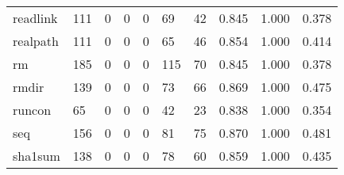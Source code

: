 \begin{longtable}{lp{1.3cm}p{1.3cm}p{1.3cm}p{1.3cm}p{1.3cm}p{1.3cm}p{1.3cm}p{1.3cm}p{1.3cm}}
readlink  &                    111 &                                             0 &                                            0 &                                           0 &                                           69 &                                         42 &                                0.845 &                                  1.000 &                                0.378 \\
realpath  &                    111 &                                             0 &                                            0 &                                           0 &                                           65 &                                         46 &                                0.854 &                                  1.000 &                                0.414 \\
rm        &                    185 &                                             0 &                                            0 &                                           0 &                                          115 &                                         70 &                                0.845 &                                  1.000 &                                0.378 \\
rmdir     &                    139 &                                             0 &                                            0 &                                           0 &                                           73 &                                         66 &                                0.869 &                                  1.000 &                                0.475 \\
runcon    &                     65 &                                             0 &                                            0 &                                           0 &                                           42 &                                         23 &                                0.838 &                                  1.000 &                                0.354 \\
seq       &                    156 &                                             0 &                                            0 &                                           0 &                                           81 &                                         75 &                                0.870 &                                  1.000 &                                0.481 \\
sha1sum   &                    138 &                                             0 &                                            0 &                                           0 &                                           78 &                                         60 &                                0.859 &                                  1.000 &                                0.435 \\

\end{longtable}

